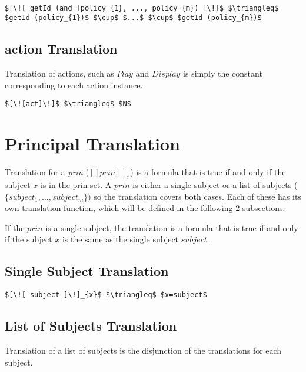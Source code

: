 \lstset{mathescape, language=AST}  
\begin{lstlisting}[frame=single, caption={getId for Policies},label={lst:getIdAndPolicyAST}]

$[\![ getId (and [policy_{1}, ..., policy_{m}) ]\!]$ $\triangleq$ $getId (policy_{1})$ $\cup$ $...$ $\cup$ $getId (policy_{m})$
\end{lstlisting}

\subsection{action Translation}\label{sec:acttranslation}

Translation of actions, such as $Play$ and $Display$ is simply the constant corresponding to each action instance.

\lstset{mathescape, language=AST}  
\begin{lstlisting}[frame=single, caption={act Translation},label={lst:actiontranslationAST}]
$[\![act]\!]$ $\triangleq$ $N$
\end{lstlisting}


\section{Principal Translation}
Translation for a \emph{prin} ($[\![ prin ]\!]_{x}$) is a formula that is true if and only if the subject $x$ is in the prin set. A $prin$ is either a single subject or a list of subjects ($\{ subject_{1}, ..., subject_{m} \})$ so the translation covers both cases. Each of these has its own translation function, which will be defined in the following 2 subsections.


If the $prin$ is a single subject, the translation is a formula that is true if and only if the subject $x$ is the same as the single subject $subject$.

\subsection{Single Subject Translation}
\lstset{mathescape, language=AST}  
\begin{lstlisting}[frame=single, caption={Prin Translation {$\colon$} Single subject},label={lst:transprinSingle}]
$[\![ subject ]\!]_{x}$ $\triangleq$ $x=subject$
\end{lstlisting}

\subsection{List of Subjects Translation}
Translation of a list of subjects is the disjunction of the translations for each subject.

